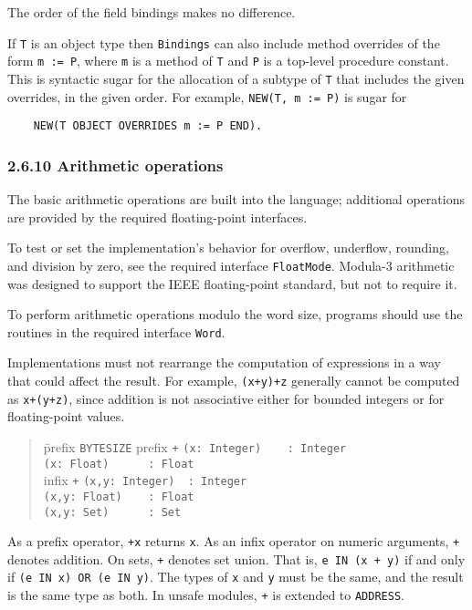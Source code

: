 \documentclass[10pt]{article}
\begin{document}
The order of the field bindings makes no difference.

If \verb|T| is an object type then \verb|Bindings| can also include method
overrides of the form \verb|m := P|, where \verb|m| is a method of \verb|T|
and \verb|P| is a top-level procedure constant.  This is syntactic sugar for
the allocation of a subtype of \verb|T| that includes the given overrides, in
the given order.  For example, \verb|NEW(T, m := P)| is sugar for
\begin{verbatim}
    NEW(T OBJECT OVERRIDES m := P END).
\end{verbatim}

\subsubsection*{2.6.10 Arithmetic operations}

The basic arithmetic operations are built into the language; additional
operations are provided by the required floating-point interfaces.

To test or set the implementation's behavior for overflow, underflow,
rounding, and division by zero, see the required interface \verb|FloatMode|.
Modula-3 arithmetic was designed to support the IEEE floating-point standard,
but not to require it.

To perform arithmetic operations modulo the word size, programs should use the
routines in the required interface \verb|Word|.

Implementations must not rearrange the computation of expressions in a way
that could affect the result.  For example, \verb|(x+y)+z| generally cannot be
computed as \verb|x+(y+z)|, since addition is not associative either for
bounded integers or for floating-point values.

\begin{quote}
  \begin{tabbing}
    \=prefix  \= \verb|BYTESIZE|\= \kill
    \>prefix  \> \verb|+|       \> \verb|(x: Integer)    : Integer| \\
    \>        \>                \> \verb|(x: Float)      : Float| \\
    \>infix   \> \verb|+|       \> \verb|(x,y: Integer)  : Integer| \\
    \>        \>                \> \verb|(x,y: Float)    : Float| \\
    \>        \>                \> \verb|(x,y: Set)      : Set|
  \end{tabbing}
\end{quote}
As a prefix operator, \verb|+x| returns \verb|x|.  As an infix operator on
numeric arguments, \verb|+| denotes addition.  On sets, \verb|+| denotes set
union.  That is, \verb|e IN (x + y)| if and only if
\verb|(e IN x) OR (e IN y)|.  The types of \verb|x| and \verb|y| must be the
same, and the result is the same type as both.  In unsafe modules, \verb|+| is
extended to \verb|ADDRESS|.
\end{document}

